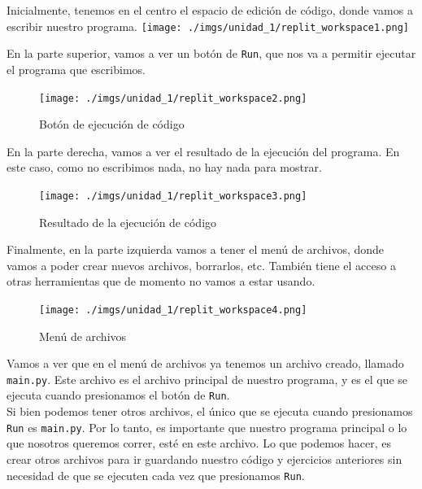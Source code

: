 \documentclass[
  letterpaper,
  DIV=11,
  numbers=noendperiod]{scrreprt}
\begin{document}
Inicialmente, tenemos en el centro el espacio de edición de código,
donde vamos a escribir nuestro programa.
\texttt{[image: ./imgs/unidad\_1/replit\_workspace1.png]}

En la parte superior, vamos a ver un botón de \texttt{Run}, que nos va a
permitir ejecutar el programa que escribimos.

\begin{figure}[H]

{\centering \texttt{[image: ./imgs/unidad\_1/replit\_workspace2.png]}

}

\caption{Botón de ejecución de código}

\end{figure}%

En la parte derecha, vamos a ver el resultado de la ejecución del
programa. En este caso, como no escribimos nada, no hay nada para
mostrar.

\begin{figure}[H]

{\centering \texttt{[image: ./imgs/unidad\_1/replit\_workspace3.png]}

}

\caption{Resultado de la ejecución de código}

\end{figure}%

Finalmente, en la parte izquierda vamos a tener el menú de archivos,
donde vamos a poder crear nuevos archivos, borrarlos, etc. También tiene
el acceso a otras herramientas que de momento no vamos a estar usando.

\begin{figure}[H]

{\centering \texttt{[image: ./imgs/unidad\_1/replit\_workspace4.png]}

}

\caption{Menú de archivos}

\end{figure}%

Vamos a ver que en el menú de archivos ya tenemos un archivo creado,
llamado \texttt{main.py}. Este archivo es el archivo principal de
nuestro programa, y es el que se ejecuta cuando presionamos el botón de
\texttt{Run}.\\
Si bien podemos tener otros archivos, el único que se ejecuta cuando
presionamos \texttt{Run} es \texttt{main.py}. Por lo tanto, es
importante que nuestro programa principal o lo que nosotros queremos
correr, esté en este archivo. Lo que podemos hacer, es crear otros
archivos para ir guardando nuestro código y ejercicios anteriores sin
necesidad de que se ejecuten cada vez que presionamos \texttt{Run}.
\end{document}
